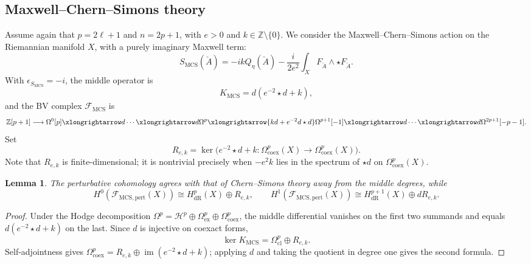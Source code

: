 \documentclass[12pt]{amsart}
\numberwithin{table}{section}
\numberwithin{equation}{section}
\newtheorem{lem}{Lemma}[section]
\theoremstyle{plain}
\newcommand{\sF}{\mathcal{F}}
\newcommand{\Z}{\mathbb{Z}}
\begin{document}
\subsection{Maxwell--Chern--Simons theory}

Assume again that $p=2\ell+1$ and $n=2p+1$, with $e>0$ and $k\in\Z\setminus\{0\}$. We consider the Maxwell--Chern--Simons action on the Riemannian manifold $X$, with a purely imaginary Maxwell term:
\[
S_{\mathrm{MCS}}(\check A)
=-ikQ_\eta(\check A)-\frac{i}{2e^2}\int_XF_{\check A}\wedge\star F_{\check A}.
\]
With $\epsilon_{S_\mathrm{MCS}}=-i$, the middle operator is
\[
K_{\mathrm{MCS}}=d(e^{-2}\star d+k),
\]
and the BV complex $\sF_{\mathrm{MCS}}$ is
\begin{equation*}
	\Z[p+1]\longrightarrow
	\Omega^0[p]\xlongrightarrow d\cdots\xlongrightarrow d
	\Omega^p\xlongrightarrow{k d + e^{-2} d \star d}
	\Omega^{p+1}[-1]\xlongrightarrow d\cdots\xlongrightarrow d
	\Omega^{2p+1}[-p-1].
\end{equation*}
Set
\[
R_{e,k}=\ker\bigl(e^{-2}\star d+k:\Omega^p_{\mathrm{coex}}(X)\to\Omega^p_{\mathrm{coex}}(X)\bigr).
\]
Note that $R_{e,k}$ is finite-dimensional; it is nontrivial precisely when $-e^2k$ lies in the spectrum of $\star d$ on $\Omega^p_{\mathrm{coex}}(X)$.

\begin{lem}\label{lem:MCS-cohomology}
The perturbative cohomology agrees with that of Chern--Simons theory away from the middle degrees, while
\[
H^0(\sF_{\mathrm{MCS},\mathrm{pert}}(X))
\cong H^p_{\mathrm{dR}}(X)\oplus R_{e,k},
\qquad
H^1(\sF_{\mathrm{MCS},\mathrm{pert}}(X))
\cong H^{p+1}_{\mathrm{dR}}(X)\oplus dR_{e,k}.
\]
\end{lem}
\begin{proof}
Under the Hodge decomposition
$\Omega^p=\mathcal H^p\oplus\Omega^p_{\mathrm{ex}}\oplus\Omega^p_{\mathrm{coex}}$,
the middle differential vanishes on the first two summands and equals $d(e^{-2}\star d+k)$ on the last. Since $d$ is injective on coexact forms,
\[
\ker K_{\mathrm{MCS}}=\Omega^p_{\mathrm{cl}}\oplus R_{e,k}.
\]
Self-adjointness gives $\Omega^p_{\mathrm{coex}}=R_{e,k}\oplus\operatorname{im}(e^{-2}\star d+k)$; applying $d$ and taking the quotient in degree one gives the second formula.
\end{proof}
\end{document}
